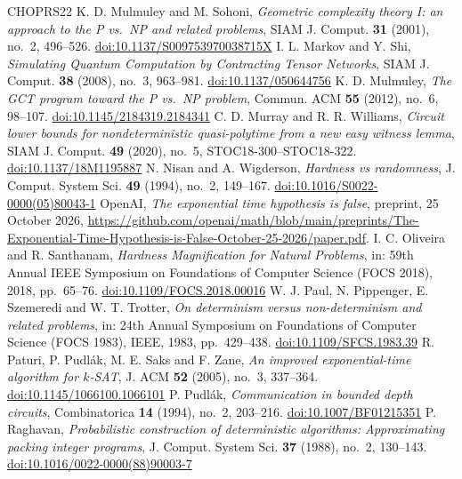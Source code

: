 \begin{thebibliography}{CHOPRS22}
 K. D. Mulmuley and M. Sohoni, \emph{Geometric complexity theory I: an approach to the P vs.\ NP and related problems}, SIAM J. Comput. \textbf{31} (2001), no.~2, 496--526. \href{https://doi.org/10.1137/S009753970038715X}{doi:10.1137/S009753970038715X}
 I. L. Markov and Y. Shi, \emph{Simulating Quantum Computation by Contracting Tensor Networks}, SIAM J. Comput. \textbf{38} (2008), no.~3, 963--981. \href{https://doi.org/10.1137/050644756}{doi:10.1137/050644756}
 K. D. Mulmuley, \emph{The GCT program toward the P vs.\ NP problem}, Commun. ACM \textbf{55} (2012), no.~6, 98--107. \href{https://doi.org/10.1145/2184319.2184341}{doi:10.1145/2184319.2184341}
 C. D. Murray and R. R. Williams, \emph{Circuit lower bounds for nondeterministic quasi-polytime from a new easy witness lemma}, SIAM J. Comput. \textbf{49} (2020), no.~5, STOC18-300--STOC18-322. \href{https://doi.org/10.1137/18M1195887}{doi:10.1137/18M1195887}
 N. Nisan and A. Wigderson, \emph{Hardness vs randomness}, J. Comput. System Sci. \textbf{49} (1994), no.~2, 149--167. \href{https://doi.org/10.1016/S0022-0000(05)80043-1}{doi:10.1016/S0022-0000(05)80043-1}
 OpenAI, \emph{The exponential time hypothesis is false}, preprint, 25 October 2026, \url{https://github.com/openai/math/blob/main/preprints/The-Exponential-Time-Hypothesis-is-False-October-25-2026/paper.pdf}.
 I. C. Oliveira and R. Santhanam, \emph{Hardness Magnification for Natural Problems}, in: 59th Annual IEEE Symposium on Foundations of Computer Science (FOCS 2018), 2018, pp.~65--76. \href{https://doi.org/10.1109/FOCS.2018.00016}{doi:10.1109/FOCS.2018.00016}
 W. J. Paul, N. Pippenger, E. Szemeredi and W. T. Trotter, \emph{On determinism versus non-determinism and related problems}, in: 24th Annual Symposium on Foundations of Computer Science (FOCS 1983), IEEE, 1983, pp.~429--438. \href{https://doi.org/10.1109/SFCS.1983.39}{doi:10.1109/SFCS.1983.39}
 R. Paturi, P. Pudl{\'a}k, M. E. Saks and F. Zane, \emph{An improved exponential-time algorithm for $k$-SAT}, J. ACM \textbf{52} (2005), no.~3, 337--364. \href{https://doi.org/10.1145/1066100.1066101}{doi:10.1145/1066100.1066101}
 P. Pudl{\'a}k, \emph{Communication in bounded depth circuits}, Combinatorica \textbf{14} (1994), no.~2, 203--216. \href{https://doi.org/10.1007/BF01215351}{doi:10.1007/BF01215351}
 P. Raghavan, \emph{Probabilistic construction of deterministic algorithms: Approximating packing integer programs}, J. Comput. System Sci. \textbf{37} (1988), no.~2, 130--143. \href{https://doi.org/10.1016/0022-0000(88)90003-7}{doi:10.1016/0022-0000(88)90003-7}

\end{thebibliography}
